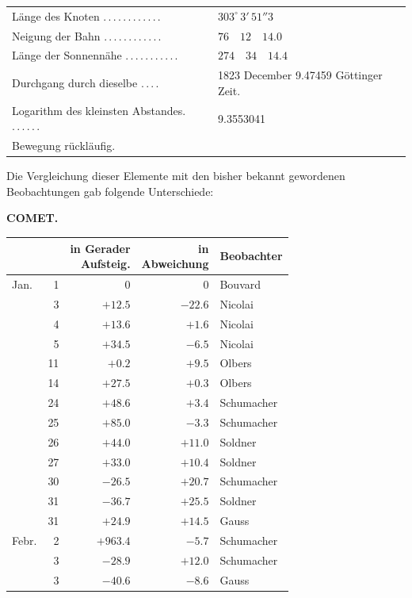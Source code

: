 \begin{center}
\begingroup\small
\begin{tabular}{p{.51\linewidth}p{.41\linewidth}}
Länge des Knoten \mbox{.\,.\,.\,.\,.\,.\,.\,.\,.\,.\,.\,.} & $303^\circ\,3'\,51''3$ \\
Neigung der Bahn \mbox{.\,.\,.\,.\,.\,.\,.\,.\,.\,.\,.\,.} & $76\quad12\quad14.0$ \\
Länge der Sonnennähe \mbox{.\,.\,.\,.\,.\,.\,.\,.\,.\,.\,.} & $274\quad34\quad14.4$ \\
Durchgang durch dieselbe \mbox{.\,.\,.\,.} & 1823 December 9.47459 Göttinger Zeit. \\
Logarithm des kleinsten Abstandes. \mbox{.\,.\,.\,.\,.\,.} & 9.3553041 \\
\multicolumn{2}{l}{Bewegung rückläufig.} \\
\end{tabular}
\endgroup
\end{center}

Die Vergleichung dieser Elemente mit den bisher bekannt gewordenen
Beobachtungen gab folgende Unterschiede:

\clearpage
\noindent{}%
%
\parbox[t]{\dimexpr\linewidth-24mm\relax}{\centering\footnotesize\bfseries COMET.\par}%
\makebox[12mm][r]{}\par\nobreak\medskip


\begin{center}
\begin{tabular}{lr|r|r|l}
 & & \shortstack{in Gerader\\Aufsteig.} & \shortstack{in\\Abweichung} & Beobachter \\
\hline
Jan. & 1 & 0 & 0 & Bouvard \\
 & 3 & $+12.5$ & $-22.6$ & Nicolai \\
 & 4 & $+13.6$ & $+1.6$ & Nicolai \\
 & 5 & $+34.5$ & $-6.5$ & Nicolai \\
 & 11 & $+0.2$ & $+9.5$ & Olbers \\
 & 14 & $+27.5$ & $+0.3$ & Olbers \\
 & 24 & $+48.6$ & $+3.4$ & Schumacher \\
 & 25 & $+85.0$ & $-3.3$ & Schumacher \\
 & 26 & $+44.0$ & $+11.0$ & Soldner \\
 & 27 & $+33.0$ & $+10.4$ & Soldner \\
 & 30 & $-26.5$ & $+20.7$ & Schumacher \\
 & 31 & $-36.7$ & $+25.5$ & Soldner \\
 & 31 & $+24.9$ & $+14.5$ & Gauss \\
Febr. & 2 & $+963.4$ & $-5.7$ & Schumacher \\
 & 3 & $-28.9$ & $+12.0$ & Schumacher \\
 & 3 & $-40.6$ & $-8.6$ & Gauss \\
\end{tabular}
\end{center}

